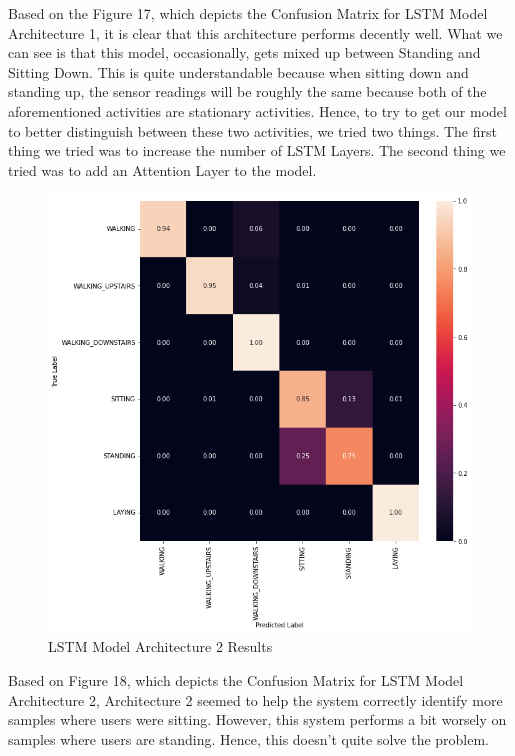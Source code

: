 \documentclass[conference]{IEEEtran}
\begin{document}
Based on the Figure 17, which depicts the Confusion Matrix for LSTM Model Architecture 1, it is clear that this architecture performs decently well. What we can see is that this model, occasionally, gets mixed up between Standing and Sitting Down. This is quite understandable because when sitting down and standing up, the sensor readings will be roughly the same because both of the aforementioned activities are stationary activities. Hence, to try to get our model to better distinguish between these two activities, we tried two things. The first thing we tried was to increase the number of LSTM Layers. The second thing we tried was to add an Attention Layer to the model. 

\begin{figure}[h!]
	\includegraphics[width= 0.9 \linewidth]{LSTM(2)_Results.png}
	\centering
	\caption{LSTM Model Architecture 2 Results}
	\label{LSTM(2)_Results.png}
\end{figure}

Based on Figure 18, which depicts the Confusion Matrix for LSTM Model Architecture 2, Architecture 2 seemed to help the system correctly identify more samples where users were sitting. However, this system performs a bit worsely on samples where users are standing. Hence, this doesn't quite solve the problem. 
\end{document}
